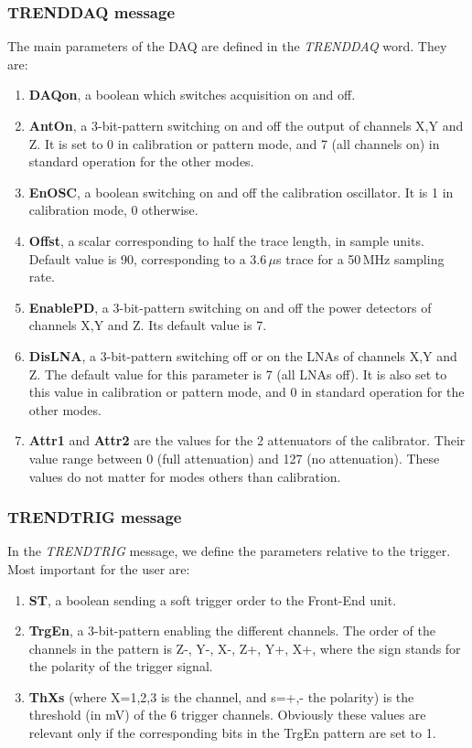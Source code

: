 \subsubsection{TRENDDAQ message}
\label{TRENDDAQ}
The main  parameters of the DAQ are defined in the {\it TRENDDAQ} word. They are:
\begin{enumerate}[-]
\item{{\bf DAQon}, a boolean which switches acquisition on and off.} 
\item{{\bf AntOn}, a 3-bit-pattern switching on and off the output of channels X,Y and Z. It is set to 0 in calibration or pattern mode, and 7 (all channels on) in standard operation for the other modes.}
\item{{\bf EnOSC}, a boolean switching on and  off the calibration oscillator. It is 1 in calibration mode, 0 otherwise. }
\item{{\bf Offst}, a scalar corresponding to half the trace length, in sample units. Default value is 90, corresponding to a 3.6\,$\mu$s trace for a 50\,MHz sampling rate.}
\item{{\bf EnablePD}, a 3-bit-pattern switching on and off the power detectors of channels X,Y and Z. Its default value is 7.}	
\item{{\bf DisLNA}, a 3-bit-pattern switching off or on the LNAs of channels X,Y and Z.  The default value for this parameter is 7 (all LNAs off). It is also set to this value in calibration or pattern mode, and 0 in standard operation for the other modes. }
\item{{\bf Attr1} and {\bf Attr2} are the values for the 2 attenuators of the calibrator. Their value range between 0 (full attenuation) and 127 (no attenuation). These values do not matter for modes others than calibration.} 
\end{enumerate}

\subsubsection{TRENDTRIG message}
\label{TRENDTRIG}
In the {\it TRENDTRIG} message, we define the parameters relative to the trigger. Most important for the user are:
\begin{enumerate}[-]
\item{{\bf ST}, a boolean sending a soft trigger order to the Front-End unit.}
\item{{\bf TrgEn},  a 3-bit-pattern enabling the different channels. The order of the channels in the pattern is Z-, Y-, X-, Z+, Y+, X+, where the sign stands for the polarity of the trigger signal.}
\item{{\bf ThXs} (where X=1,2,3 is the channel, and s=+,- the polarity) is the threshold (in mV) of the 6 trigger channels. Obviously these values are relevant only if the corresponding bits in the TrgEn pattern are set to 1.}
\end{enumerate}
